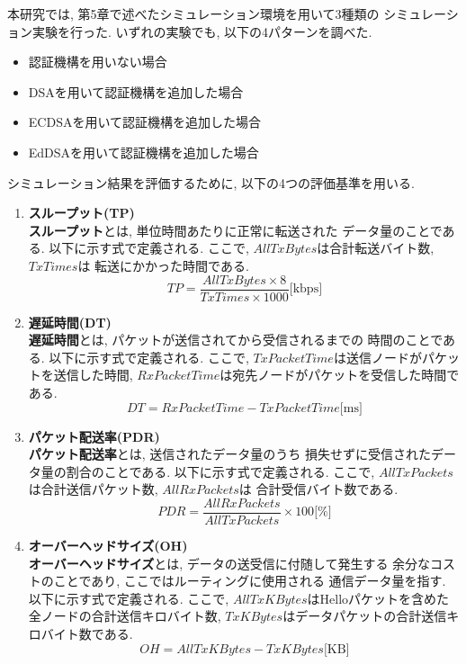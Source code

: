 本研究では, 第5章で述べたシミュレーション環境を用いて3種類の
シミュレーション実験を行った. いずれの実験でも, 以下の4パターンを調べた. 
\begin{itemize}
  \item 認証機構を用いない場合
  \item DSAを用いて認証機構を追加した場合
  \item ECDSAを用いて認証機構を追加した場合
  \item EdDSAを用いて認証機構を追加した場合
\end{itemize}
\indent シミュレーション結果を評価するために, 
以下の4つの評価基準を用いる. 
\begin{enumerate}
  \item \textbf{スループット(TP)}\\
  \indent \textbf{スループット}とは, 単位時間あたりに正常に転送された
  データ量のことである. 以下に示す式で定義される. ここで, 
  $AllTxBytes$は合計転送バイト数, $TxTimes$は
  転送にかかった時間である. \\
  \[
    TP = \frac{AllTxBytes\times 8}{TxTimes\times 1000}\text{[kbps]}
  \]
  \item \textbf{遅延時間(DT)}\\
  \indent \textbf{遅延時間}とは, パケットが送信されてから受信されるまでの
  時間のことである. 以下に示す式で定義される. ここで,
  $TxPacketTime$は送信ノードがパケットを送信した時間, 
  $RxPacketTime$は宛先ノードがパケットを受信した時間である. \\
  \[
    DT = RxPacketTime - TxPacketTime \text{[ms]}
  \]

  \item \textbf{パケット配送率(PDR)}\\
  \indent \textbf{パケット配送率}とは, 送信されたデータ量のうち
  損失せずに受信されたデータ量の割合のことである. 以下に示す式で定義される. 
  ここで, $AllTxPackets$は合計送信パケット数, $AllRxPackets$は
  合計受信バイト数である. \\
  \[
    PDR = \frac{AllRxPackets}{AllTxPackets} \times 100 \text{[\%]}
  \]

  \item \textbf{オーバーヘッドサイズ(OH)}\\
  \indent \textbf{オーバーヘッドサイズ}とは, データの送受信に付随して発生する
  余分なコストのことであり, ここではルーティングに使用される
  通信データ量を指す. 以下に示す式で定義される. ここで, 
  $AllTxKBytes$はHelloパケットを含めた全ノードの合計送信キロバイト数, 
  $TxKBytes$はデータパケットの合計送信キロバイト数である. \\
  \[
    OH = AllTxKBytes - TxKBytes \text{[KB]}
  \]
\end{enumerate}
\vspace{2em}

